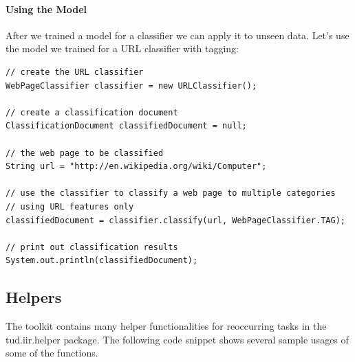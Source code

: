 \documentclass[a4paper,twoside]{article}      %
\begin{document}
\paragraph{Using the Model}
After we trained a model for a classifier we can apply it to unseen data. Let's use the model we trained for a URL classifier with tagging:

\begin{codelisting}
\begin{lstlisting}[frame=tb]
// create the URL classifier
WebPageClassifier classifier = new URLClassifier();

// create a classification document
ClassificationDocument classifiedDocument = null;

// the web page to be classified
String url = "http://en.wikipedia.org/wiki/Computer";

// use the classifier to classify a web page to multiple categories
// using URL features only
classifiedDocument = classifier.classify(url, WebPageClassifier.TAG);

// print out classification results
System.out.println(classifiedDocument);
\end{lstlisting}
\end{codelisting}

\subsection{Helpers}
The toolkit contains many helper functionalities for reoccurring tasks in the tud.iir.helper package.
The following code snippet shows several sample usages of some of the functions.
\end{document}
